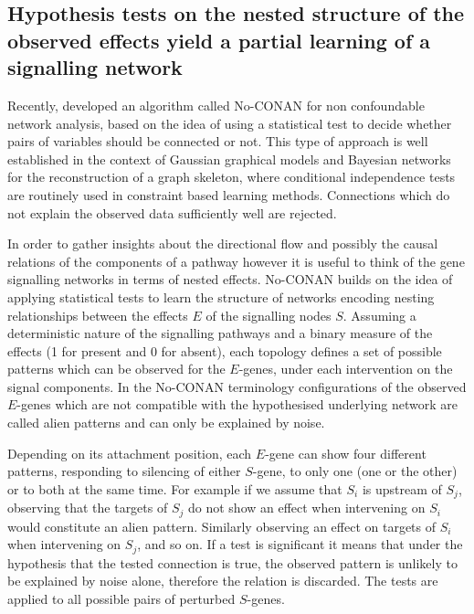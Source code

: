 
 \subsection*{Hypothesis tests on the nested structure of the observed effects yield a partial learning of a signalling network}

Recently, \cite{art:SadehMS2013} developed an algorithm called No-CONAN for non confoundable network analysis, based on the idea of using a statistical test to decide whether pairs of variables should be connected or not. This type of approach is well established in the context of Gaussian graphical models and Bayesian networks for the reconstruction of a graph skeleton, where conditional independence tests are routinely used in constraint based learning methods. Connections which do not explain the observed data sufficiently well are rejected. 

In order to gather insights about the directional flow and possibly the causal relations of the components of a pathway however it is useful to think of the gene signalling networks in terms of nested effects. No-CONAN builds on the idea of applying statistical tests to learn the structure of networks encoding nesting relationships between the effects $E$ of the signalling nodes $S$. Assuming a deterministic nature of the signalling pathways and a binary measure of the effects (1 for present and 0 for absent), each topology defines a set of possible patterns which can be observed for the $E$-genes, under each intervention on the signal components. In the No-CONAN terminology configurations of the observed $E$-genes which are not compatible with the hypothesised underlying network are called alien patterns and can only be explained by noise. 

 Depending on its attachment position, each $E$-gene can show four different patterns, responding to silencing of either $S$-gene, to only one (one or the other) or to both at the same time. For example if we assume that $S_i$ is upstream of $S_j$, observing that the targets of $S_j$ do not show an effect when intervening on $S_i$ would constitute an alien pattern. Similarly observing an effect on targets of $S_i$ when intervening on $S_j$, and so on. If a test is significant it means that under the hypothesis that the tested connection is true, the observed pattern is unlikely to be explained by noise alone, therefore the relation is discarded. The tests are applied to all possible pairs of perturbed $S$-genes. 

